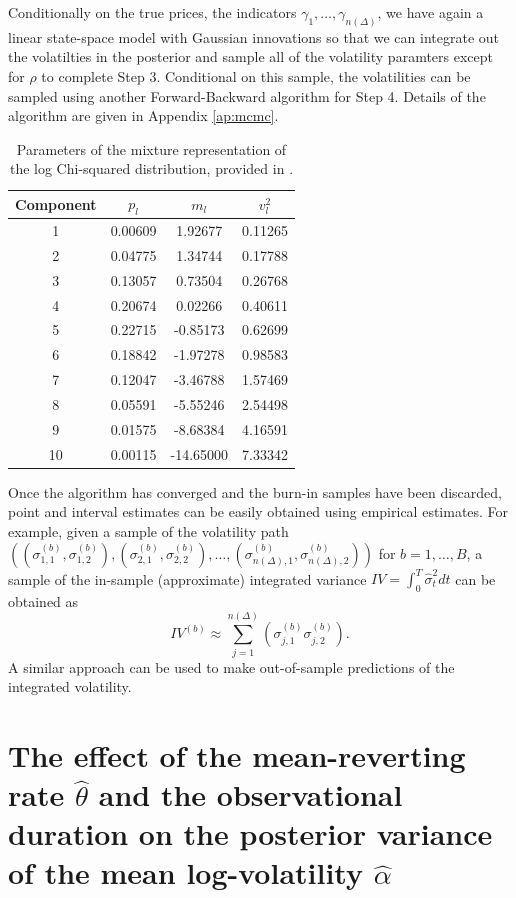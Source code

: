 \documentclass[10pt]{article}
\newcommand{\hsigma}{\hat{\sigma}}
\begin{document}
Conditionally on the true prices, the indicators $\gamma_{1}, \ldots, \gamma_{n(\Delta)}$, we have again a linear state-space model with Gaussian innovations so that we can integrate out the volatilties in the posterior and sample all of the volatility paramters except for $\rho$ to complete Step 3. Conditional on this sample, the volatilities can be sampled using another Forward-Backward algorithm for Step 4. Details of the algorithm are given in Appendix \ref{ap:mcmc}.
\begin{table}
\begin{center}
\begin{tabular}{c|ccc}
Component   &   $p_l$   &   $m_l$   &   $v^2_l$  \\ \hline
1 & 0.00609 & 1.92677 & 0.11265 \\
2 & 0.04775 & 1.34744 & 0.17788 \\
3 & 0.13057 & 0.73504 & 0.26768 \\
4 & 0.20674 & 0.02266 & 0.40611 \\
5 & 0.22715 & -0.85173 & 0.62699 \\
6 & 0.18842 &-1.97278 & 0.98583 \\
7 & 0.12047 & -3.46788  & 1.57469 \\
8 & 0.05591 & -5.55246 & 2.54498 \\
9 & 0.01575 & -8.68384 & 4.16591 \\
10 & 0.00115 & -14.65000 & 7.33342
\end{tabular}
\caption{Parameters of the mixture representation of the log Chi-squared distribution, provided in \cite{omori2007stochastic}.}\label{ta:mixture_parameters}
\end{center}
\end{table}

Once the algorithm has converged and the burn-in samples have been discarded, point and interval estimates can be easily obtained using empirical estimates.  For example, given a sample of the volatility path $\left( (\sigma^{(b)}_{1,1},\sigma^{(b)}_{1,2}), (\sigma^{(b)}_{2,1},\sigma^{(b)}_{2,2}), \ldots,  (\sigma^{(b)}_{n(\Delta),1}, \sigma^{(b)}_{n(\Delta),2}) \right)$ for $b=1, \ldots, B$, a sample of the in-sample (approximate) integrated variance $IV = \int_0^T \hsigma^2_t dt$ can be obtained as
$$
IV^{(b)} \approx \sum_{j=1}^{n(\Delta)} \left( \sigma^{(b)}_{j,1}\sigma^{(b)}_{j,2} \right)   .
$$
A similar approach can be used to make out-of-sample predictions of the integrated volatility.


\section{The effect of the mean-reverting rate $\hat{\theta}$ and the observational duration on the posterior variance of the mean log-volatility $\hat{\alpha}$}\label{effect-mean-reverting-rate}
\end{document}

